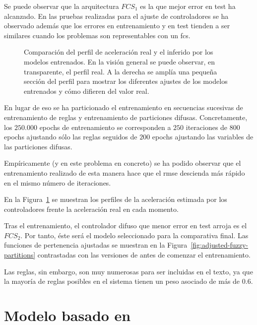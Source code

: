 Se puede observar que la arquitectura $FCS_1$ es la que mejor error en test ha alcanzado. En las pruebas realizadas para el ajuste de controladores se ha observado además que los errores en entrenamiento y en test tienden a ser similares cuando los problemas son representables con un \ac{fcs}.

\begin{figure}[t]
	\centering
	\qquad
	\caption[Comparación del perfil de aceleración real y el inferido por los modelos entrenados]{Comparación del perfil de aceleración real y el inferido por los modelos entrenados. En la visión general se puede observar, en transparente, el perfil real. A la derecha se amplía una pequeña sección del perfil para mostrar los diferentes ajustes de los modelos entrenados y cómo difieren del valor real.}
	\label{fig:fcs-test-comparisons}
\end{figure}

En lugar de eso se ha particionado el entrenamiento en secuencias sucesivas de entrenamiento de reglas y entrenamiento de particiones difusas. Concretamente, los $250.000$ epochs de entrenamiento se corresponden a $250$ iteraciones de $800$ epochs ajustando sólo las reglas seguidos de $200$ epochs ajustando las variables de las particiones difusas.

Empíricamente (y en este problema en concreto) se ha podido observar que el entrenamiento realizado de esta manera hace que el \ac{rmse} descienda más rápido en el mismo número de iteraciones.

En la Figura~\ref{fig:fcs-test-comparisons} se muestran los perfiles de la aceleración estimada por los controladores frente la aceleración real en cada momento. 

Tras el entrenamiento, el controlador difuso que menor error en test arroja es el $FCS_2$. Por tanto, éste será el modelo seleccionado para la comparativa final. Las funciones de pertenencia ajustadas se muestran en la Figura~\ref{fig:adjusted-fuzzy-partitions} contrastadas con las versiones de antes de comenzar el entrenamiento.

Las reglas, sin embargo, son muy numerosas para ser incluidas en el texto, ya que la mayoría de reglas posibles en el sistema tienen un peso asociado de más de $0.6$.

\section{Modelo basado en }

